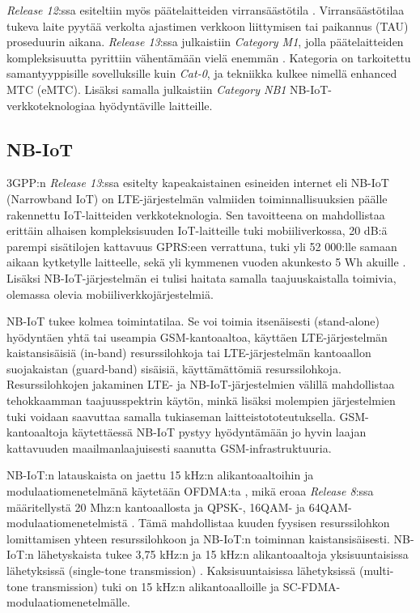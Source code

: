 \documentclass[finnish, 12pt, a4paper, elec, latin1, utf8, online]{aaltothesis}
\begin{document}
\textit{Release 12}:ssa esiteltiin myös päätelaitteiden virransäästötila \cite{nokiawhitepaper}. Virransäästötilaa tukeva laite pyytää verkolta ajastimen verkkoon liittymisen tai paikannus (TAU) proseduurin aikana. \textit{Release 13}:ssa \cite{release13} julkaistiin \textit{Category M1}, jolla päätelaitteiden kompleksisuutta pyrittiin vähentämään vielä enemmän \cite{gsmawhitepaper}. Kategoria on tarkoitettu samantyyppisille sovelluksille kuin \textit{Cat-0}, ja tekniikka kulkee nimellä enhanced MTC (eMTC). Lisäksi samalla julkaistiin \textit{Category NB1} NB-IoT-verkkoteknologiaa hyödyntäville laitteille. 

\subsection{NB-IoT}

3GPP:n \textit{Release 13}:ssa esitelty kapeakaistainen esineiden internet eli NB-IoT (Narrowband IoT) on LTE-järjestelmän valmiiden toiminnallisuuksien päälle rakennettu IoT-laitteiden verkkoteknologia. Sen tavoitteena on mahdollistaa erittäin alhaisen kompleksisuuden IoT-laitteille tuki mobiiliverkossa, 20 dB:ä parempi sisätilojen kattavuus GPRS:een verrattuna, tuki yli 52 000:lle samaan aikaan kytketylle laitteelle, sekä yli kymmenen vuoden akunkesto 5 Wh akuille \cite{ratasuk2016overview}. Lisäksi NB-IoT-järjestelmän ei tulisi haitata samalla taajuuskaistalla toimivia, olemassa olevia mobiiliverkkojärjestelmiä.

NB-IoT tukee kolmea toimintatilaa. Se voi toimia itsenäisesti (stand-alone) hyödyntäen yhtä tai useampia GSM-kantoaaltoa, käyttäen LTE-järjestelmän kaistansisäisiä (in-band) resurssilohkoja tai LTE-järjestelmän kantoaallon suojakaistan (guard-band) sisäisiä, käyttämättömiä resurssilohkoja. Resurssilohkojen jakaminen LTE- ja NB-IoT-järjestelmien välillä mahdollistaa tehokkaamman taajuusspektrin käytön, minkä lisäksi molempien järjestelmien tuki voidaan saavuttaa samalla tukiaseman laitteistototeutuksella. GSM-kantoaaltoja käytettäessä NB-IoT pystyy hyödyntämään jo hyvin laajan kattavuuden maailmanlaajuisesti saanutta GSM-infrastruktuuria. \cite{ratasuk2016nb, ratasuk2016overview}

NB-IoT:n latauskaista on jaettu 15 kHz:n alikantoaaltoihin ja modulaatiomenetelmänä käytetään OFDMA:ta \cite{ratasuk2016nb}, mikä eroaa \textit{Release 8}:ssa määritellystä 20 Mhz:n kantoaallosta ja QPSK-, 16QAM- ja 64QAM-modulaatiomenetelmistä \cite{release8}. Tämä mahdollistaa kuuden fyysisen resurssilohkon lomittamisen yhteen resurssilohkoon ja NB-IoT:n toiminnan kaistansisäisesti. NB-IoT:n lähetyskaista tukee 3,75 kHz:n ja 15 kHz:n alikantoaaltoja yksisuuntaisissa lähetyksissä (single-tone transmission) \cite{ratasuk2016nb}. Kaksisuuntaisissa lähetyksissä (multi-tone transmission) tuki on 15 kHz:n alikantoaalloille ja SC-FDMA-modulaatiomenetelmälle.
\end{document}
